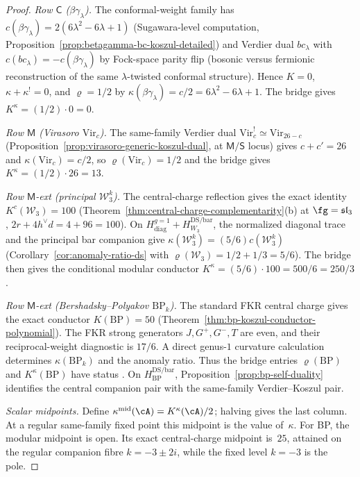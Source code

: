 \begin{proof}
\emph{Row $\mathsf{C}$ ($\beta\gamma_\lambda$).} The conformal-weight
family has $c(\beta\gamma_\lambda) = 2(6\lambda^2 - 6\lambda + 1)$
\textup{(}Sugawara-level computation,
Proposition~\ref{prop:betagamma-bc-koszul-detailed}\textup{)} and Verdier
dual $bc_\lambda$ with $c(bc_\lambda) = -c(\beta\gamma_\lambda)$
by Fock-space parity flip (bosonic versus fermionic reconstruction of
the same $\lambda$-twisted conformal structure). Hence $K = 0$,
$\kappa + \kappa^! = 0$, and $\varrho = 1/2$ by
$\kappa(\beta\gamma_\lambda) = c/2 = 6\lambda^2 - 6\lambda + 1$. The
bridge gives $K^\kappa = (1/2) \cdot 0 = 0$.

\emph{Row $\mathsf{M}$ (Virasoro $\mathrm{Vir}_c$).} The
same-family Verdier dual $\mathrm{Vir}_c^! \simeq \mathrm{Vir}_{26-c}$
\textup{(}Proposition~\ref{prop:virasoro-generic-koszul-dual}, at
$\mathsf{M}/\mathsf{S}$ locus\textup{)} gives $c + c' = 26$ and
$\kappa(\mathrm{Vir}_c) = c/2$, so
$\varrho(\mathrm{Vir}_c) = 1/2$ and the bridge gives
$K^\kappa = (1/2) \cdot 26 = 13$.

\emph{Row $\mathsf{M}$-ext (principal $\mathcal{W}_3^k$).}
The central-charge reflection gives the exact identity
$K^c(\mathcal{W}_3)=100$
\textup{(}Theorem~\ref{thm:central-charge-complementarity}(b) at
$\fg = \mathfrak{sl}_3$, $2r + 4h^\vee d = 4 + 96 = 100$\textup{)}.
On
$H_{\mathrm{diag}}^{g=1}+H_{W_3}^{\mathrm{DS/bar}}$, the normalized
diagonal trace and the principal bar companion give
$\kappa(\mathcal{W}_3^k) = (5/6) c(\mathcal{W}_3^k)$
\textup{(}Corollary~\ref{cor:anomaly-ratio-ds} with
$\varrho(\mathcal{W}_3) = 1/2 + 1/3 = 5/6$\textup{)}.
The bridge then gives the conditional modular conductor
$K^\kappa = (5/6) \cdot 100 = 500/6 = 250/3$.

\emph{Row $\mathsf{M}$-ext (Bershadsky--Polyakov $\mathrm{BP}_k$).}
The standard FKR central charge gives the exact conductor
$K(\mathrm{BP})=50$
\textup{(}Theorem~\ref{thm:bp-koszul-conductor-polynomial}\textup{)}.
The FKR strong generators $J,G^+,G^-,T$ are even, and their
reciprocal-weight diagnostic is $17/6$.  A direct genus-$1$ curvature
calculation determines $\kappa(\mathrm{BP}_k)$ and the anomaly ratio.
Thus the bridge entries $\varrho(\mathrm{BP})$ and
$K^\kappa(\mathrm{BP})$ have status \ClaimStatusOpen.  On
$H_{\mathrm{BP}}^{\mathrm{DS/bar}}$,
Proposition~\ref{prop:bp-self-duality} identifies the central companion
pair with the same-family Verdier--Koszul pair.

\emph{Scalar midpoints.} Define
$\kappa^{\mathrm{mid}}(\cA)=K^\kappa(\cA)/2$; halving gives the last
column.  At a regular same-family fixed point this midpoint is the
value of~$\kappa$.  For BP, the modular midpoint is open.  Its exact
central-charge midpoint is~$25$, attained on the regular companion
fibre $k=-3\pm2i$, while the fixed level $k=-3$ is the pole.


\end{proof}

